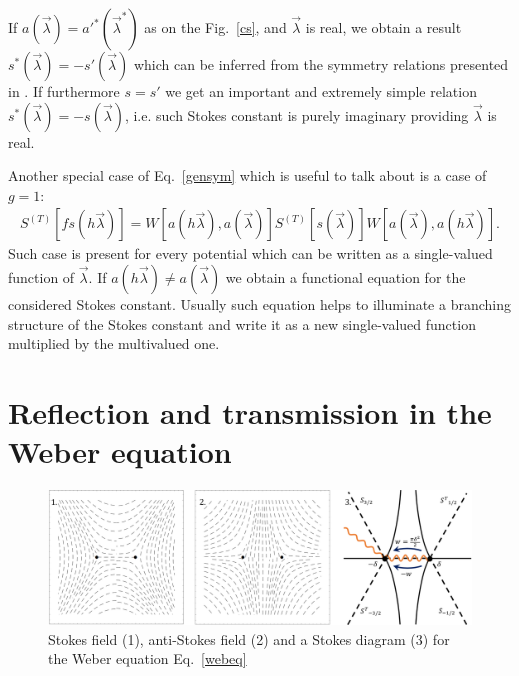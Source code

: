 \documentclass[aps,prl,preprint,superscriptaddress]{revtex4}
\begin{document}
If $a(\vec{\lambda})=a'^*(\vec{\lambda}^*)$ as on the Fig.~\ref{cs}, and $\vec{\lambda}$ is real, we obtain a result 
$s^*(\vec{\lambda})=-s'(\vec{\lambda})$ which can be inferred from the symmetry relations presented in \cite{symm}. 
If furthermore $s=s'$ we get an important and extremely simple relation $s^*(\vec{\lambda})=-s(\vec{\lambda})$, i.e. such Stokes constant is purely imaginary providing $\vec{\lambda}$ is real.

Another special case of Eq.~\ref{gensym} which is useful to talk about is a case of $g=1$:
\begin{eqnarray}
S^{(T)}[f s(h\vec{\lambda})] = 
W[a(h\vec{\lambda}),a(\vec{\lambda})]S^{(T)}[s(\vec{\lambda})]W[a(\vec{\lambda}),a(h\vec{\lambda})].
\label{funceq}
\end{eqnarray}
Such case is present for every potential which can be written as a single-valued function of $\vec{\lambda}$. If $a(h\vec{\lambda}) \neq a(\vec{\lambda})$ we obtain a functional equation for the considered Stokes constant. Usually such equation helps to illuminate a branching structure of the Stokes constant and write it as a new single-valued function multiplied by the multivalued one.

\section{Reflection and transmission in the Weber equation \label{WEBER}}

\begin{figure}
\centering
\noindent
\includegraphics[scale=.5]{stuff/wsd.png}
\caption{Stokes field (1), anti-Stokes field (2) and a Stokes diagram (3) for the Weber equation Eq.~\ref{webeq}}
\label{wsd}
\end{figure} 
\end{document}
